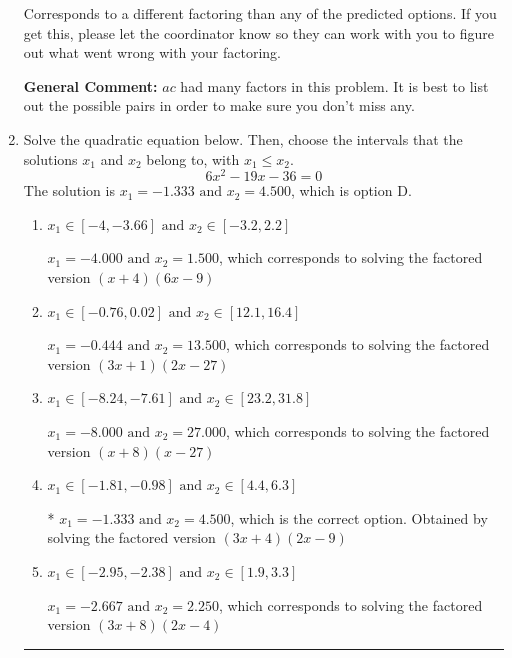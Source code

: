 \documentclass{extbook}[14pt]
\newcommand{\litem}[1]{\item #1

\rule{\textwidth}{0.4pt}}
\begin{document}
\begin{enumerate}
{\begin{enumerate}[label=\Alph*.]
 Corresponds to a different factoring than any of the predicted options. If you get this, please let the coordinator know so they can work with you to figure out what went wrong with your factoring.
\end{enumerate}

\textbf{General Comment:} $ac$ had many factors in this problem. It is best to list out the possible pairs in order to make sure you don't miss any.
}
\litem{
Solve the quadratic equation below. Then, choose the intervals that the solutions $x_1$ and $x_2$ belong to, with $x_1 \leq x_2$.
\[ 6x^{2} -19 x -36 = 0 \]
The solution is \( x_1 = -1.333 \text{ and } x_2 = 4.500 \), which is option D.\begin{enumerate}[label=\Alph*.]
\item \( x_1 \in [-4, -3.66] \text{ and } x_2 \in [-3.2, 2.2] \)

$x_1 = -4.000 \text{ and } x_2 = 1.500$, which corresponds to solving the factored version $(x + 4)(6x -9)$
\item \( x_1 \in [-0.76, 0.02] \text{ and } x_2 \in [12.1, 16.4] \)

$x_1 = -0.444 \text{ and } x_2 = 13.500$, which corresponds to solving the factored version $(3x + 1)(2x -27)$
\item \( x_1 \in [-8.24, -7.61] \text{ and } x_2 \in [23.2, 31.8] \)

$x_1 = -8.000 \text{ and } x_2 = 27.000$, which corresponds to solving the factored version $(x + 8)(x -27)$
\item \( x_1 \in [-1.81, -0.98] \text{ and } x_2 \in [4.4, 6.3] \)

* $x_1 = -1.333 \text{ and } x_2 = 4.500$, which is the correct option. Obtained by solving the factored version $(3x + 4)(2x -9)$
\item \( x_1 \in [-2.95, -2.38] \text{ and } x_2 \in [1.9, 3.3] \)

$x_1 = -2.667 \text{ and } x_2 = 2.250$, which corresponds to solving the factored version $(3x + 8)(2x -4)$
\end{enumerate}

}
\end{enumerate}
\end{document}
